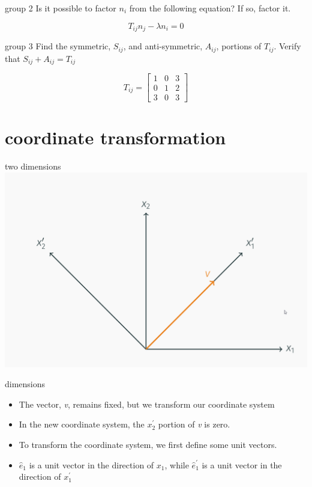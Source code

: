 \documentclass[
  letterpaper,
  ignorenonframetext,
  aspectratio=43,
  handout,
  12pt]{beamer}
\providecommand{\tightlist}{%
  \setlength{\itemsep}{0pt}\setlength{\parskip}{0pt}}
\providecommand{\tightlist}{%
\setlength{\itemsep}{0pt}\setlength{\parskip}{0pt}}
\let\Oldincludegraphics\includegraphics
\renewcommand{\includegraphics}[2][]{\Oldincludegraphics[width=\textwidth,height=0.7\textheight,keepaspectratio]{#2}}
\begin{document}
\begin{frame}{group 2}
\protect\hypertarget{group-2}{}
Is it possible to factor \(n_i\) from the following equation? If so,
factor it.

\[T_{ij} n_j - \lambda n_i = 0\]
\end{frame}

\begin{frame}{group 3}
\protect\hypertarget{group-3}{}
Find the symmetric, \(S_{ij}\), and anti-symmetric, \(A_{ij}\), portions
of \(T_{ij}\). Verify that \(S_{ij} + A_{ij} = T_{ij}\)

\[T_{ij} = \begin{bmatrix}
      1 & 0 & 3\\
      0 & 1 & 2\\
      3 & 0 & 3
 \end{bmatrix}\]
\end{frame}

\hypertarget{coordinate-transformation}{%
\section{coordinate transformation}\label{coordinate-transformation}}

\begin{frame}{two dimensions}
\protect\hypertarget{two-dimensions}{}
\includegraphics{../images/transform2D.png}
\end{frame}

\begin{frame}{dimensions}
\protect\hypertarget{dimensions}{}
\begin{itemize}
\tightlist
\item
  The vector, \emph{v}, remains fixed, but we transform our coordinate
  system
\item
  In the new coordinate system, the \(x_2^\prime\) portion of \emph{v}
  is zero.
\item
  To transform the coordinate system, we first define some unit vectors.
\item
  \(\hat{e}_1\) is a unit vector in the direction of \(x_1\), while
  \(\hat{e}_1^\prime\) is a unit vector in the direction of
  \(x_1^\prime\)
\end{itemize}
\end{frame}
\end{document}
